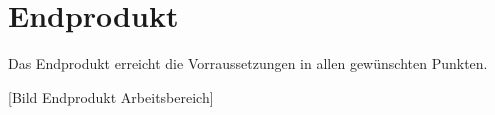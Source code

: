\section{Endprodukt}

Das Endprodukt erreicht die Vorraussetzungen in allen gewünschten Punkten.

[Bild Endprodukt Arbeitsbereich]